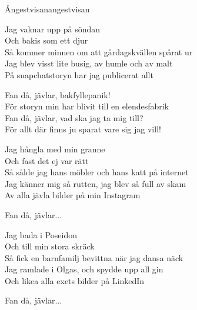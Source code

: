 \begin{song}{Ångestvisan}{angestvisan}
\begin{vers}
Jag vaknar upp på söndan\\
Och bakis som ett djur\\
Så kommer minnen om att gårdagskvällen spårat ur\\
Jag blev visst lite busig, av humle och av malt\\
På snapchatstoryn har jag publicerat allt\\
\end{vers}

\begin{vers}
Fan då, jävlar, bakfyllepanik!\\
För storyn min har blivit till en elendesfabrik\\
Fan då, jävlar, vad ska jag ta mig till?\\
För allt där finns ju sparat vare sig jag vill!\\
\end{vers}

\begin{vers}
Jag hångla med min granne\\
Och fast det ej var rätt\\
Så sålde jag hans möbler och hans katt på internet\\
Jag känner mig så rutten, jag blev så full av skam\\
Av alla jävla bilder på min Instagram\\
\end{vers}

\begin{vers}
Fan då, jävlar...\\
\end{vers}

\begin{vers}
Jag bada i Poseidon\\
Och till min stora skräck\\
Så fick en barnfamilj bevittna när jag dansa näck\\
Jag ramlade i Olgas, och spydde upp all gin\\
Och likea alla exets bilder på LinkedIn\\
\end{vers}

\begin{vers}
Fan då, jävlar...\\
\end{vers}
\end{song}